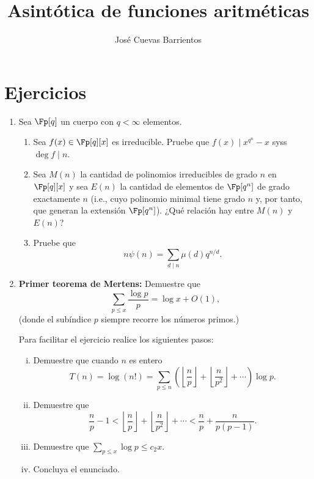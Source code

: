 \documentclass[11pt, reqno]{amsart}
\title{Asintótica de funciones aritméticas}
\date{\DTMdate{2025-09-18}}
\author[José Cuevas]{José Cuevas Barrientos}
\begin{document}
\maketitle

\section{Ejercicios}
\begin{enumerate}
	\item\lookright
		Sea $\Fp[q]$ un cuerpo con $q < \infty$ elementos.
		\begin{enumerate}
			\item Sea $f(x) \in \Fp[q][x]$ es irreducible.
				Pruebe que $f(x) \mid x^{q^n} - x$ syss $\deg f \mid n$.

			\item Sea $M(n)$ la cantidad de polinomios irreducibles de grado $n$ en $\Fp[q][x]$ y sea $E(n)$ la cantidad de
				elementos de $\Fp[q^n]$ de grado exactamente $n$ (i.e., cuyo polinomio minimal tiene grado $n$ y, por tanto,
				que generan la extensión $\Fp[q^n]$).
				¿Qué relación hay entre $M(n)$ y $E(n)$?

			\item Pruebe que
				\[
					n \psi(n) = \sum_{d \mid n} \mu(d) q^{n/d}.
				\]
		\end{enumerate}

		\newex
	\item
		\textbf{Primer teorema de Mertens:} Demuestre que
		$$ \sum_{p\le x} \frac{\log p}{p} = \log x + O(1), $$
		(donde el subíndice $p$ siempre recorre los números primos.)

		Para facilitar el ejercicio realice los siguientes pasos:
		\begin{enumerate}[(i)]
			\item Demuestre que cuando $n$ es entero
				\[
					T(n) = \log(n!) = \sum_{p \le n} \left( \left\lfloor \frac np \right\rfloor + \left\lfloor \frac{n}{p^2} \right\rfloor
					+ \cdots \right) \log p.
				\]

			\item Demuestre que
				$$ \frac{n}{p} - 1 < \left\lfloor \frac np \right\rfloor + \left\lfloor \frac{n}{p^2} \right\rfloor + \cdots
				< \frac{n}{p} + \frac{n}{p(p - 1)}. $$

			\item Demuestre que $\sum_{p \le x} \log p \le c_2 x$.

			\item Concluya el enunciado.
		\end{enumerate}


\end{enumerate}
\end{document}
